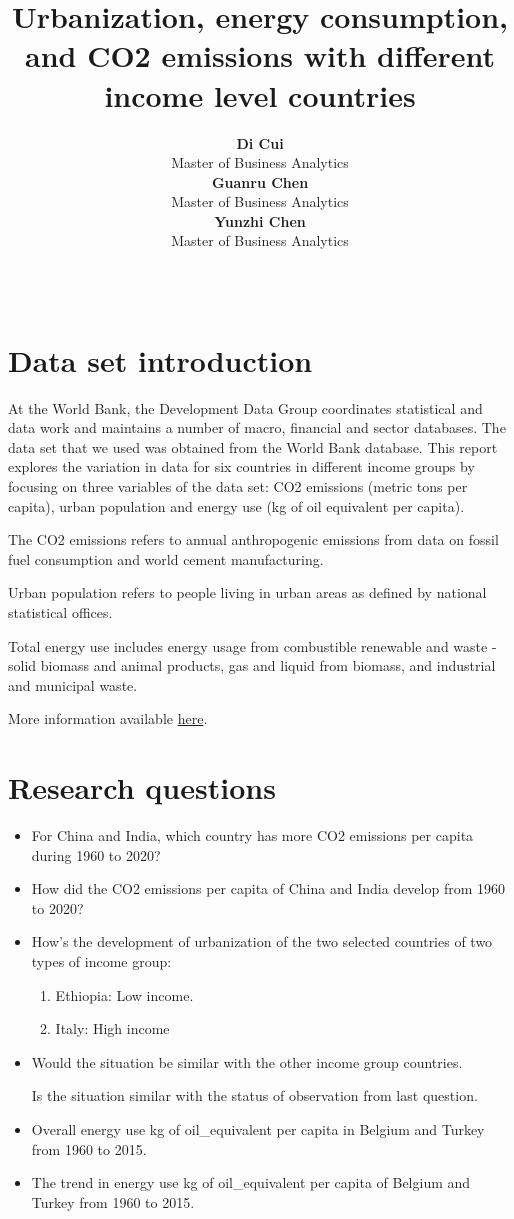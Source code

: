 \documentclass[11pt,a4paper,]{article}
\title{Urbanization, energy consumption, and CO2 emissions with different income level countries}
\author{\sf\Large\textbf{ Di Cui}\\ {\sf\large Master of Business Analytics\\[0.5cm]} \sf\Large\textbf{ Guanru Chen}\\ {\sf\large Master of Business Analytics\\[0.5cm]} \sf\Large\textbf{ Yunzhi Chen}\\ {\sf\large Master of Business Analytics\\[0.5cm]}}
\date{\sf\Date~\Month~\Year}
\makeatletter
\providecommand{\tightlist}{%
  \setlength{\itemsep}{0pt}\setlength{\parskip}{0pt}}
\def\titlepage{\front{\expandafter{\@title}}{\@author}{\@organization}}
\makeatother
\begin{document}
\titlepage

\hypertarget{data-set-introduction}{%
\section{Data set introduction}\label{data-set-introduction}}

At the World Bank, the Development Data Group coordinates statistical and data work and maintains a number of macro, financial and sector databases. The data set that we used was obtained from the World Bank database. This report explores the variation in data for six countries in different income groups by focusing on three variables of the data set: CO2 emissions (metric tons per capita), urban population and energy use (kg of oil equivalent per capita).

The CO2 emissions refers to annual anthropogenic emissions from data on fossil fuel consumption and world cement manufacturing.

Urban population refers to people living in urban areas as defined by national statistical offices.

Total energy use includes energy usage from combustible renewable and waste - solid biomass and animal products, gas and liquid from biomass, and industrial and municipal waste.

More information available \href{https://data.worldbank.org/}{here}.

\hypertarget{research-questions}{%
\section{Research questions}\label{research-questions}}

\begin{itemize}
\item
  For China and India, which country has more CO2 emissions per capita during 1960 to 2020?
\item
  How did the CO2 emissions per capita of China and India develop from 1960 to 2020?
\item
  How's the development of urbanization of the two selected countries of two types of income group:

  \begin{enumerate}
  \def\labelenumi{\arabic{enumi}.}
  \tightlist
  \item
    Ethiopia: Low income.
  \item
    Italy: High income
  \end{enumerate}
\item
  Would the situation be similar with the other income group countries.

  Is the situation similar with the status of observation from last question.
\item
  Overall energy use kg of oil\_equivalent per capita in Belgium and Turkey from 1960 to 2015.
\item
  The trend in energy use kg of oil\_equivalent per capita of Belgium and Turkey from 1960 to 2015.
\end{itemize}
\end{document}
